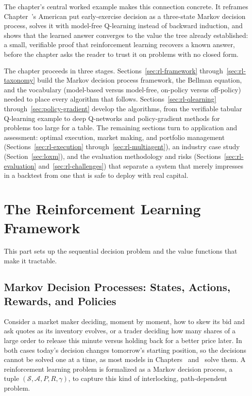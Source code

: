 \documentclass[../ai_in_finance]{subfiles}
\begin{document}
The chapter's central worked example makes this connection concrete. It reframes Chapter~'s American put early-exercise decision as a three-state Markov decision process, solves it with model-free Q-learning instead of backward induction, and shows that the learned answer converges to the value the tree already established: a small, verifiable proof that reinforcement learning recovers a known answer, before the chapter asks the reader to trust it on problems with no closed form.

The chapter proceeds in three stages. Sections~\ref{sec:rl-framework} through~\ref{sec:rl-taxonomy} build the Markov decision process framework, the Bellman equation, and the vocabulary (model-based versus model-free, on-policy versus off-policy) needed to place every algorithm that follows. Sections~\ref{sec:rl-qlearning} through~\ref{sec:policy-gradient} develop the algorithms, from the verifiable tabular Q-learning example to deep Q-networks and policy-gradient methods for problems too large for a table. The remaining sections turn to application and assessment: optimal execution, market making, and portfolio management (Sections~\ref{sec:rl-execution} through~\ref{sec:rl-multiagent}), an industry case study (Section~\ref{sec:loxm}), and the evaluation methodology and risks (Sections~\ref{sec:rl-evaluation} and~\ref{sec:rl-challenges}) that separate a system that merely impresses in a backtest from one that is safe to deploy with real capital.

\section{The Reinforcement Learning Framework}

This part sets up the sequential decision problem and the value functions that make it tractable.

\subsection{Markov Decision Processes: States, Actions, Rewards, and Policies}
\label{sec:rl-framework}

Consider a market maker deciding, moment by moment, how to skew its bid and ask quotes as its inventory evolves, or a trader deciding how many shares of a large order to release this minute versus holding back for a better price later. In both cases today's decision changes tomorrow's starting position, so the decisions cannot be solved one at a time, as most models in Chapters~ and~ solve them. A reinforcement learning problem is formalized as a Markov decision process, a tuple $(\mathcal{S}, \mathcal{A}, P, R, \gamma)$, to capture this kind of interlocking, path-dependent problem.
\end{document}
